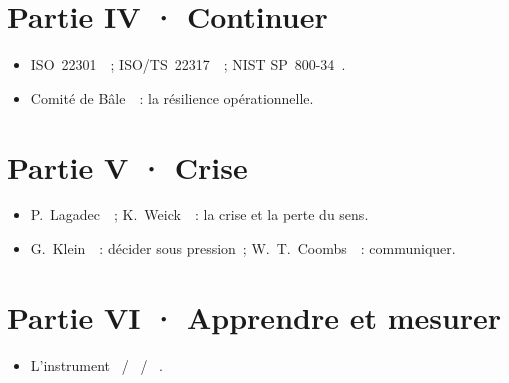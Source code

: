 \section*{Partie IV · Continuer}
\begin{itemize}
    \item ISO~22301~\cite{iso22301_2019}~; ISO/TS~22317~\cite{iso22317_2021}~; NIST SP~800-34~\cite{nist80034}.
    \item Comité de Bâle~\cite{bcbs2021resilience}~: la résilience opérationnelle.
\end{itemize}

\section*{Partie V · Crise}
\begin{itemize}
    \item P.~Lagadec~\cite{lagadec1991}~; K.~Weick~\cite{weick1993}~: la crise et la perte du sens.
    \item G.~Klein~\cite{klein1998}~: décider sous pression~; W.~T.~Coombs~\cite{coombs2007}~: communiquer.
\end{itemize}

\section*{Partie VI · Apprendre et mesurer}
\begin{itemize}
    \item L'instrument \OUI{}~/ \NON{}~/ \NEK{}~\cite{minka2026nek}.
\end{itemize}

